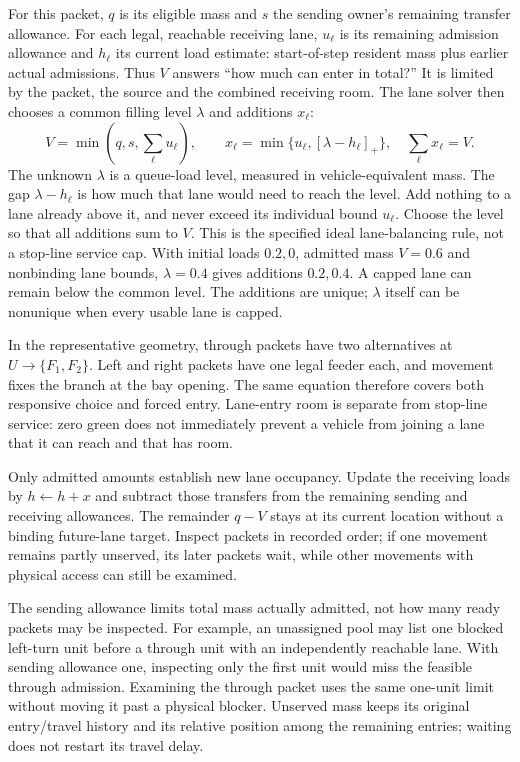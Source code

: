 \documentclass[10pt,a4paper]{article}
\begin{document}
For this packet, $q$ is its eligible mass and $s$ the sending owner's
remaining transfer allowance. For each legal, reachable receiving lane,
$u_\ell$ is its remaining admission allowance and $h_\ell$ its current
load estimate: start-of-step resident mass plus earlier actual admissions.
Thus $V$ answers ``how much can enter in total?'' It is limited by the
packet, the source and the combined receiving room. The lane solver then
chooses a common filling level $\lambda$ and additions $x_\ell$:
\begin{equation}
 V=\min(q,s,\sum_\ell u_\ell),\qquad
 x_\ell=\min\{u_\ell,[\lambda-h_\ell]_+\},\quad
 \sum_\ell x_\ell=V .
 \label{eq:compact-allocation}
\end{equation}
The unknown $\lambda$ is a queue-load level, measured in vehicle-equivalent
mass. The gap $\lambda-h_\ell$ is how much that lane would need to reach
the level. Add nothing to a lane already above it, and never exceed its
individual bound $u_\ell$. Choose the level so that all additions sum to
$V$. This is the specified ideal lane-balancing rule, not a stop-line
service cap. With initial loads $0.2,0$, admitted mass $V=0.6$ and
nonbinding lane bounds, $\lambda=0.4$ gives additions $0.2,0.4$.
A capped lane can remain below the common level. The additions are unique;
$\lambda$ itself can be nonunique when every usable lane is capped.

In the representative geometry, through packets have two alternatives
at $U\to\{F_1,F_2\}$. Left and right packets have one legal feeder each,
and movement fixes the branch at the bay opening. The same equation
therefore covers both responsive choice and forced entry. Lane-entry
room is separate from stop-line service: zero green does not immediately
prevent a vehicle from joining a lane that it can reach and that has room.

Only admitted amounts establish new lane occupancy. Update the receiving
loads by $h\leftarrow h+x$ and subtract those transfers from the remaining
sending and receiving allowances. The remainder $q-V$ stays at its current
location without a binding future-lane target. Inspect packets in recorded
order; if one movement remains partly unserved, its later packets wait,
while other movements with physical access can still be examined.

\begin{samepage}
The sending allowance limits total mass actually admitted, not how many
ready packets may be inspected. For example, an unassigned pool may list
one blocked left-turn unit before a through unit with an independently
reachable lane. With sending allowance one, inspecting only the first
unit would miss the feasible through admission. Examining the through
packet uses the same one-unit limit without moving it past a physical
blocker. Unserved mass keeps its original entry/travel history and its
relative position among the remaining entries; waiting does not restart
its travel delay.
\par\end{samepage}
\end{document}
